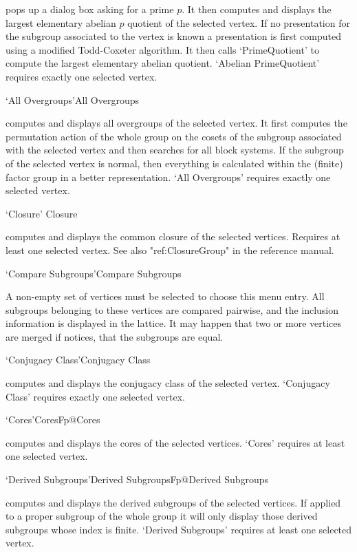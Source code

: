 pops  up a dialog  box asking  for a  prime  $p$.  It  then computes  and
displays the largest elementary   abelian  $p$ quotient of  the  selected
vertex.  If no presentation for the  subgroup associated to the vertex is
known   a presentation is  first computed  using  a modified Todd-Coxeter
algorithm.     It then calls    `PrimeQuotient' to   compute  the largest
elementary abelian quotient.  `Abelian PrimeQuotient' requires exactly one
selected vertex. 

\>`All Overgroups'{All Overgroups}

computes and   displays all overgroups   of the selected vertex.   It first
computes the permutation  action of the whole group  on  the cosets of  the
subgroup  associated with  the selected vertex  and then  searches for  all
block  systems. If the   subgroup of the   selected vertex is  normal, then
everything is   calculated within the  (finite) factor  group in   a better
representation. `All Overgroups' requires exactly one selected vertex.

\>`Closure' {Closure}

computes and displays the common closure of the selected vertices.
Requires at least one selected vertex. See also "ref:ClosureGroup" in the
{\GAP} reference manual.

\>`Compare Subgroups'{Compare Subgroups}

A non-empty set of vertices must be selected to choose this menu entry. All
subgroups belonging to these vertices are compared pairwise, and the inclusion
information is displayed in the lattice. It may happen that two or more
vertices are merged if {\GAP} notices, that the subgroups are
equal. 

\>`Conjugacy Class'{Conjugacy Class}

computes and  displays  the   conjugacy  class of  the   selected vertex.
`Conjugacy Class' requires  exactly  one selected vertex.  

\>`Cores'{CoresFp}@{Cores}

computes and  displays the cores  of the selected vertices.   `Cores'
requires at least one selected vertex.

\>`Derived Subgroups'{Derived SubgroupsFp}@{Derived Subgroups}

computes and displays the derived subgroups of  the selected vertices. 
If applied   to a proper subgroup  of   the whole group it   will only
display  those derived  subgroups  whose  index is  finite.   `Derived
Subgroups' requires at least one selected vertex.

